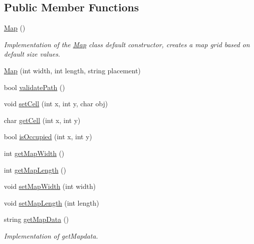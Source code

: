 \subsection*{Public Member Functions}
\begin{DoxyCompactItemize}
\item 
\hypertarget{class_map_a0f5ad0fd4563497b4214038cbca8b582}{}\label{class_map_a0f5ad0fd4563497b4214038cbca8b582} 
\hyperlink{class_map_a0f5ad0fd4563497b4214038cbca8b582}{Map} ()
\begin{DoxyCompactList}\small\item\em Implementation of the \hyperlink{class_map}{Map} class default constructor, creates a map grid based on default size values. \end{DoxyCompactList}\item 
\hyperlink{class_map_a6c356d09b5b7c946b5a3cf23dbabe0b2}{Map} (int width, int length, string placement)
\item 
bool \hyperlink{class_map_a91d9e239a9871b99a5d6d2d5d46b0504}{validate\+Path} ()
\item 
void \hyperlink{class_map_a33db81a058134a3a56b904ca3d3932fd}{set\+Cell} (int x, int y, char obj)
\item 
char \hyperlink{class_map_adcb714600f271eec55f28cdb4f92dbb3}{get\+Cell} (int x, int y)
\item 
bool \hyperlink{class_map_a79e5ced99d160ca9b680661169f16d84}{is\+Occupied} (int x, int y)
\item 
int \hyperlink{class_map_a286853d8475bc1bbede582c89e9b1491}{get\+Map\+Width} ()
\item 
int \hyperlink{class_map_aad03e74940d81cf9307bb0dae7e8814b}{get\+Map\+Length} ()
\item 
void \hyperlink{class_map_a58b540416c67a94fba30bf513397cf45}{set\+Map\+Width} (int width)
\item 
void \hyperlink{class_map_a6d3075b61e6b9fd06e0c75235a9629ed}{set\+Map\+Length} (int length)
\item 
\hypertarget{class_map_ae37a3b0439938533d8b2286fcb0f57da}{}\label{class_map_ae37a3b0439938533d8b2286fcb0f57da} 
string \hyperlink{class_map_ae37a3b0439938533d8b2286fcb0f57da}{get\+Map\+Data} ()
\begin{DoxyCompactList}\small\item\em Implementation of get\+Mapdata. \end{DoxyCompactList}\item 
\hypertarget{class_map_a94074365bf7aaa7aef44607581f47f3e}{}\label{class_map_a94074365bf7aaa7aef44607581f47f3e} 

\end{DoxyCompactItemize}
